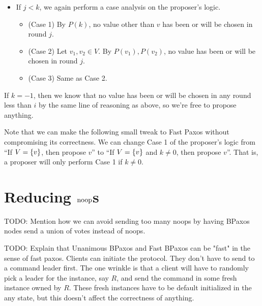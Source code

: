 \documentclass{mwhittaker}
\theoremstyle{definition}
\begin{document}
\begin{appendices}
\begin{itemize}
  \item
    If $j < k$, we again perform a case analysis on the proposer's logic.
    \begin{itemize}
      \item
        (Case 1) By $P(k)$, no value other than $v$ has been or will be chosen
        in round $j$.
      \item
        (Case 2) Let $v_1, v_2 \in V$. By $P(v_1), P(v_2)$, no value has been
        or will be chosen in round $j$.
      \item
        (Case 3) Same as Case 2.
    \end{itemize}
\end{itemize}
If $k = -1$, then we know that no value has been or will be chosen in any round
less than $i$ by the same line of reasoning as above, so we're free to propose
anything.

Note that we can make the following small tweak to Fast Paxos without
compromising its correctness. We can change Case 1 of the proposer's logic from
``If $V = \{v\}$, then propose $v$'' to ``If $V = \{v\}$ and $k \neq 0$,
then propose $v$''. That is, a proposer will only perform Case 1 if $k \neq 0$.

\section{Reducing $\text{noop}$s}
TODO: Mention how we can avoid sending too many noops by having BPaxos nodes
send a union of votes instead of noops.

TODO: Explain that Unanimous BPaxos and Fast BPaxos can be "fast" in the sense
of fast paxos. Clients can initiate the protocol. They don't have to send to a
command leader first. The one wrinkle is that a client will have to randomly
pick a leader for the instance, say $R$, and send the command in some fresh
instance owned by $R$. These fresh instances have to be default initialized in
the any state, but this doesn't affect the correctness of anything.

\end{appendices}
\end{document}
